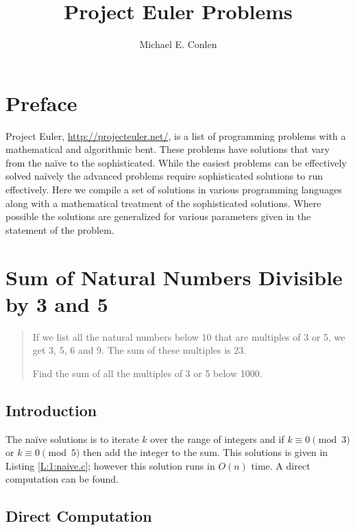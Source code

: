 \documentclass[oneside,12pt]{book}   	%
\title{Project Euler Problems}
\author{Michael E. Conlen}
\newcounter{pr}
\theoremstyle{definition}
\begin{document}
\begin{spacing}{1.618}
\frontmatter
\maketitle

\chapter*{Preface}

Project Euler, \url{http://projecteuler.net/}, is a list of programming problems with a mathematical and algorithmic bent. These problems have solutions that vary from the na\"ive to the sophisticated. While the easiest problems can be effectively solved na\"ively the advanced problems require sophisticated solutions to run effectively. Here we compile a set of solutions in various programming languages along with a mathematical treatment of the sophisticated solutions. Where possible the solutions are generalized for various parameters given in the statement of the problem. 

\tableofcontents
\lstlistoflistings
\mainmatter

	\chapter{Sum of Natural Numbers Divisible by 3 and 5}
			\begin{quote}
				If we list all the natural numbers below 10 that are multiples of 3 or 5, we get 3, 5, 6 and 9. The sum of these multiples is 23.

				Find the sum of all the multiples of 3 or 5 below 1000.
			\end{quote}

		\section{Introduction}
			
			The na\"ive solutions is to iterate $k$ over the range of integers and if $k\equiv 0\pmod 3$ or $k\equiv 0\pmod 5$ then add the integer to the sum. This solutions is given in Listing \ref{L:1:naive.c}; however this solution runs in $O(n)$ time. A direct computation can be found. 


		\section{Direct Computation}


\end{spacing}
\end{document}
